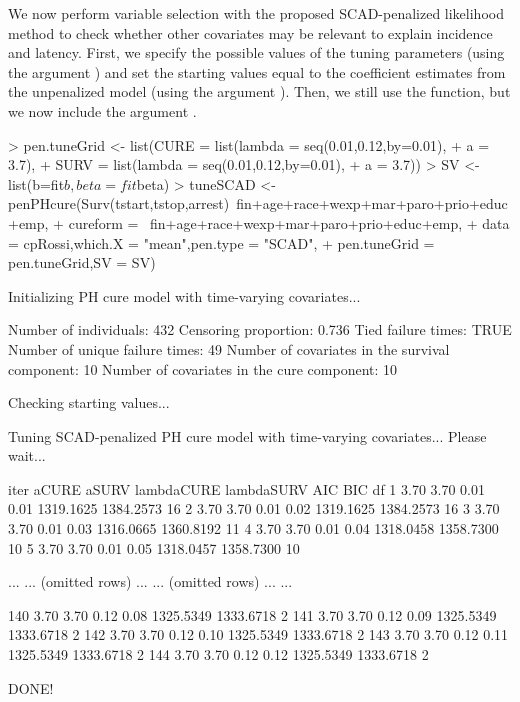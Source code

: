 We now perform variable selection with the proposed SCAD-penalized likelihood method to check whether other covariates may be relevant to explain incidence and latency. 
First, we specify the possible values of the tuning parameters (using the argument ) and set the starting values equal to the coefficient estimates from the unpenalized model (using the argument ).
Then, we still use the  function, but we now include the argument .


\begin{example}
> pen.tuneGrid <- list(CURE = list(lambda = seq(0.01,0.12,by=0.01),
+                                  a = 3.7),
+                      SURV = list(lambda = seq(0.01,0.12,by=0.01),
+                                  a = 3.7))
> SV <- list(b=fit$b,beta=fit$beta)
> tuneSCAD <- penPHcure(Surv(tstart,tstop,arrest)~fin+age+race+wexp+mar+paro+prio+educ+emp,
+                       cureform = ~fin+age+race+wexp+mar+paro+prio+educ+emp,
+                       data = cpRossi,which.X = "mean",pen.type = "SCAD",
+                       pen.tuneGrid = pen.tuneGrid,SV = SV)

Initializing PH cure model with time-varying covariates...

Number of individuals: 432
Censoring proportion: 0.736
Tied failure times: TRUE
Number of unique failure times: 49
Number of covariates in the survival component: 10
Number of covariates in the cure component: 10

Checking starting values...

Tuning SCAD-penalized PH cure model with time-varying covariates... Please wait...

  iter     aCURE     aSURV  lambdaCURE  lambdaSURV           AIC           BIC      df
     1      3.70      3.70        0.01        0.01     1319.1625     1384.2573      16
     2      3.70      3.70        0.01        0.02     1319.1625     1384.2573      16
     3      3.70      3.70        0.01        0.03     1316.0665     1360.8192      11
     4      3.70      3.70        0.01        0.04     1318.0458     1358.7300      10
     5      3.70      3.70        0.01        0.05     1318.0457     1358.7300      10
     
   ...       ...   (omitted rows)  ...         ...     (omitted rows)      ...     ...
   
   140      3.70      3.70        0.12        0.08     1325.5349     1333.6718       2
   141      3.70      3.70        0.12        0.09     1325.5349     1333.6718       2
   142      3.70      3.70        0.12        0.10     1325.5349     1333.6718       2
   143      3.70      3.70        0.12        0.11     1325.5349     1333.6718       2
   144      3.70      3.70        0.12        0.12     1325.5349     1333.6718       2

DONE!
\end{example}

